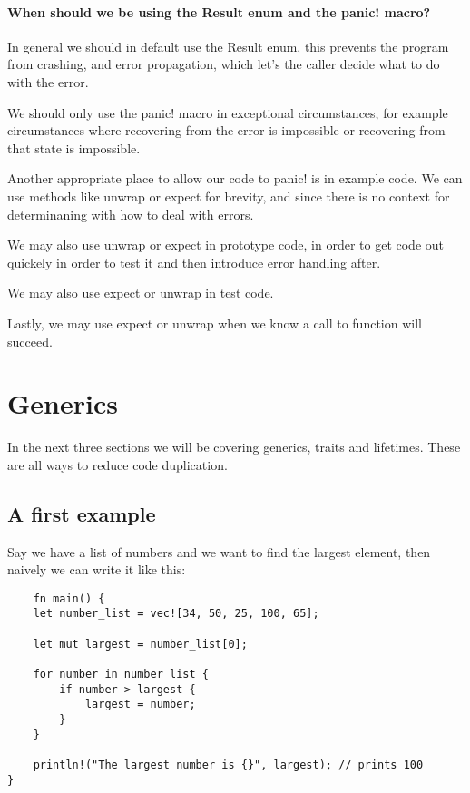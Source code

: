 \paragraph*{When should we be using the Result enum and the panic! macro?}

In general we should in default use the Result enum, this prevents the program from crashing, and error propagation, which let's the caller decide what to do with the error.

We should only use the panic! macro in exceptional circumstances, for example circumstances where recovering from the error is impossible or recovering from that state is impossible.

Another appropriate place to allow our code to panic! is in example code. We can use methods like unwrap or expect for brevity, and since there is no context for determinaning with how to deal with errors.

We may also use unwrap or expect in prototype code, in order to get code out quickely in order to test it and then introduce error handling after.

We may also use expect or unwrap in test code.

Lastly, we may use expect or unwrap when we know a call to function will succeed.

\section{Generics}
In the next three sections we will be covering generics, traits and lifetimes. These are all ways to reduce code duplication.

\subsection{A first example}

Say we have a list of numbers and we want to find the largest element, then naively we can write it like this:\begin{lstlisting}
    fn main() {
    let number_list = vec![34, 50, 25, 100, 65];

    let mut largest = number_list[0];

    for number in number_list {
        if number > largest {
            largest = number;
        }
    }

    println!("The largest number is {}", largest); // prints 100
}
\end{lstlisting}

